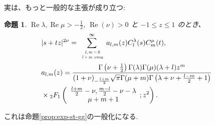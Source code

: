 \documentclass[pdf,notes]{beamer}
\newcommand{\tmop}[1]{\ensuremath{\operatorname{#1}}}
\newtheorem{prop}{命題}
\begin{document}
\begin{frame}
	実は、もっと一般的な主張が成り立つ:
	\begin{prop}\label{prop:exp-stz-gg}
		  \label{thm:4}$\tmop{Re} \lambda, \tmop{Re} \mu > - \frac{1}{2}$,
		    $\tmop{Re} (\nu) > 0$ と $-1 \leqslant z \leqslant 1$ のとき、
		      \begin{eqnarray}
			      & | s + t z |^{2 \nu}  = \sum_{\scalebox{0.6}{
				      $\begin{array}[]{c}
						  \ell,m=0\\l + m\mbox{ :even}
					  \end{array}
				  $}}^{\infty} a_{l, m}
					          (z) C_l^{\lambda} (s) C_m^{\mu} (t), &  \nonumber\\
						      & a_{l, m} (z) = \frac{\Gamma \left( \nu + \frac{1}{2} \right) \Gamma
						      (\lambda) \Gamma (\mu) (\lambda + l) z^m }{(1 + \nu)_{- \frac{l + m}{2}} \sqrt{\pi} \Gamma
										      (\mu + m) \Gamma \left( \lambda + \nu + \frac{l - m}{2} + 1 \right)}&\nonumber
										      \\&\times{}_2 F_1 \left( \begin{array}{c}
								        \frac{l + m}{2} - \nu, \frac{m - l}{2} - \nu - \lambda\\
									      \mu + m + 1
									          \end{array} ; z^2 \right). & 
										          \nonumber
											    \end{eqnarray}
										    \end{prop}
										    これは命題\ref{prop:exp-st-gg}の一般化になる.
\end{frame}
\end{document}
